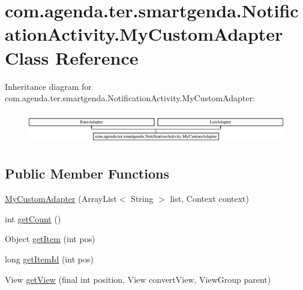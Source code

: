 \hypertarget{classcom_1_1agenda_1_1ter_1_1smartgenda_1_1_notification_activity_1_1_my_custom_adapter}{\section{com.\-agenda.\-ter.\-smartgenda.\-Notification\-Activity.\-My\-Custom\-Adapter Class Reference}
\label{classcom_1_1agenda_1_1ter_1_1smartgenda_1_1_notification_activity_1_1_my_custom_adapter}
}
Inheritance diagram for com.\-agenda.\-ter.\-smartgenda.\-Notification\-Activity.\-My\-Custom\-Adapter\-:\begin{figure}[H]
\begin{center}
\leavevmode
\includegraphics[height=1.421320cm]{classcom_1_1agenda_1_1ter_1_1smartgenda_1_1_notification_activity_1_1_my_custom_adapter}
\end{center}
\end{figure}
\subsection*{Public Member Functions}
\begin{DoxyCompactItemize}
\item 
\hyperlink{classcom_1_1agenda_1_1ter_1_1smartgenda_1_1_notification_activity_1_1_my_custom_adapter_a5e2b78854bf4c0276f70044c8b62be14}{My\-Custom\-Adapter} (Array\-List$<$ String $>$ list, Context context)
\item 
int \hyperlink{classcom_1_1agenda_1_1ter_1_1smartgenda_1_1_notification_activity_1_1_my_custom_adapter_afe502198b8321cb9eb2e139fdbc37839}{get\-Count} ()
\item 
Object \hyperlink{classcom_1_1agenda_1_1ter_1_1smartgenda_1_1_notification_activity_1_1_my_custom_adapter_a7274bd725a91a09f059125b73e3bcb28}{get\-Item} (int pos)
\item 
long \hyperlink{classcom_1_1agenda_1_1ter_1_1smartgenda_1_1_notification_activity_1_1_my_custom_adapter_a6f587656ac566d9b62ea377d55cd39b7}{get\-Item\-Id} (int pos)
\item 
View \hyperlink{classcom_1_1agenda_1_1ter_1_1smartgenda_1_1_notification_activity_1_1_my_custom_adapter_ad1f14072c58c1135716be0d344e6545c}{get\-View} (final int position, View convert\-View, View\-Group parent)
\end{DoxyCompactItemize}


